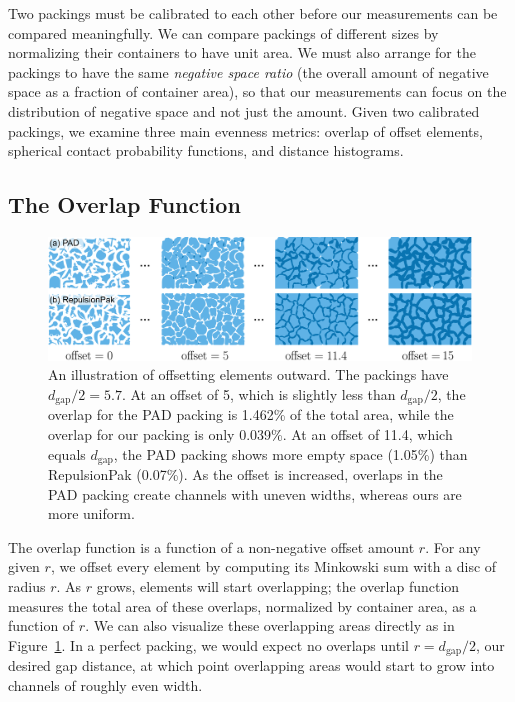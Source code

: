 \newtext
{
Two packings must be calibrated to each other before our measurements 
can be compared meaningfully.  
We can compare packings of different sizes by normalizing their containers to
have unit area.  We must also arrange for the packings to have the same
} %
\textit{negative space ratio} 
 \newtext
{(the overall amount of negative space as a 
fraction of container area), so that our measurements can focus on the
distribution of negative space and not just the amount.  Given two
calibrated packings, we examine three main evenness metrics:
overlap of offset elements, spherical contact probability functions,
and distance histograms. %
}

\subsection{The Overlap Function}

\begin{figure}[t]
\centering
\includegraphics[width=1.0\textwidth]{figures/metrics/overlap_metric.pdf}
\caption[An illustration of offsetting elements outward]
{\label{fig_overlap_function}
    An illustration of offsetting elements outward. The packings have $d_\mathrm{gap} / 2 = 5.7$.  
    At an offset of 5, which is slightly less than $d_\mathrm{gap} / 2$,
    the overlap for the PAD packing is 1.462\% of the total area, while the overlap for our packing is only 0.039\%.
    At an offset of 11.4, which equals $d_\mathrm{gap}$, the PAD packing shows more empty space (1.05\%) than RepulsionPak (0.07\%).
    As the offset is increased, overlaps in the PAD packing create channels
  with uneven widths, whereas ours are more uniform.
  }
\end{figure}

The overlap function is a function of a non-negative offset amount
$r$.  For any given $r$, we offset every element by computing its Minkowski
sum with a disc of radius $r$.  As $r$ grows, elements will start overlapping;
the overlap function measures the total area of these overlaps, normalized
by container area, as a function of $r$.  We can also visualize these 
overlapping areas directly as in Figure~\ref{fig_overlap_function}.  In a 
perfect packing, we would expect no overlaps until $r=d_\mathrm{gap}/2$,
our desired gap distance, at which point overlapping areas would start to
grow into channels of roughly even width.

